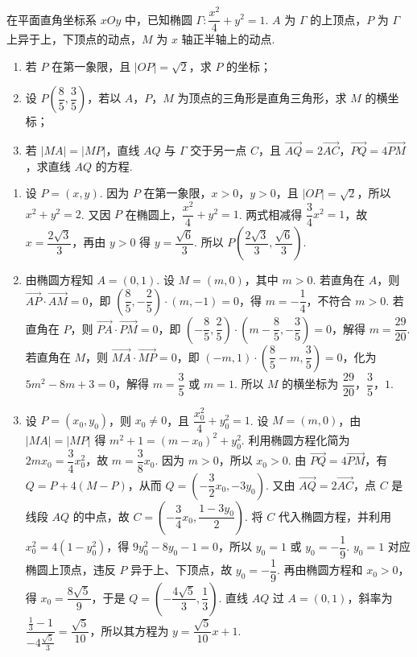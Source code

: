 \begin{problem}
在平面直角坐标系 \(xOy\) 中，已知椭圆 \(\Gamma:\dfrac{x^2}{4}+y^2=1\). \(A\) 为 \(\Gamma\) 的上顶点，\(P\) 为 \(\Gamma\) 上异于上，下顶点的动点，\(M\) 为 \(x\) 轴正半轴上的动点.

\begin{enumerate}
\item 若 \(P\) 在第一象限，且 \(\lvert OP\rvert=\sqrt2\)，求 \(P\) 的坐标；
\item 设 \(P\left(\dfrac85,\dfrac35\right)\)，若以 \(A\)，\(P\)，\(M\) 为顶点的三角形是直角三角形，求 \(M\) 的横坐标；
\item 若 \(\lvert MA\rvert=\lvert MP\rvert\)，直线 \(AQ\) 与 \(\Gamma\) 交于另一点 \(C\)，且 \(\overrightarrow{AQ}=2\overrightarrow{AC}\)，\(\overrightarrow{PQ}=4\overrightarrow{PM}\)，求直线 \(AQ\) 的方程.
\end{enumerate}
\end{problem}

\begin{solution}
\begin{enumerate}
\item 设 \(P=(x,y)\). 因为 \(P\) 在第一象限，\(x>0\)，\(y>0\)，且 \(\lvert OP\rvert=\sqrt2\)，所以 \(x^2+y^2=2\). 又因 \(P\) 在椭圆上，\(\dfrac{x^2}{4}+y^2=1\). 两式相减得 \(\dfrac34x^2=1\)，故 \(x=\dfrac{2\sqrt3}{3}\)，再由 \(y>0\) 得 \(y=\dfrac{\sqrt6}{3}\). 所以 \(P\left(\dfrac{2\sqrt3}{3},\dfrac{\sqrt6}{3}\right)\).
\item 由椭圆方程知 \(A=(0,1)\). 设 \(M=(m,0)\)，其中 \(m>0\). 若直角在 \(A\)，则 \(\overrightarrow{AP}\cdot\overrightarrow{AM}=0\)，即 \(\left(\dfrac85,-\dfrac25\right)\cdot(m,-1)=0\)，得 \(m=-\dfrac14\)，不符合 \(m>0\). 若直角在 \(P\)，则 \(\overrightarrow{PA}\cdot\overrightarrow{PM}=0\)，即 \(\left(-\dfrac85,\dfrac25\right)\cdot\left(m-\dfrac85,-\dfrac35\right)=0\)，解得 \(m=\dfrac{29}{20}\). 若直角在 \(M\)，则 \(\overrightarrow{MA}\cdot\overrightarrow{MP}=0\)，即 \((-m,1)\cdot\left(\dfrac85-m,\dfrac35\right)=0\)，化为 \(5m^2-8m+3=0\)，解得 \(m=\dfrac35\) 或 \(m=1\). 所以 \(M\) 的横坐标为 \(\dfrac{29}{20}\)，\(\dfrac35\)，\(1\).
\item 设 \(P=(x_0,y_0)\)，则 \(x_0\ne0\)，且 \(\dfrac{x_0^2}{4}+y_0^2=1\). 设 \(M=(m,0)\)，由 \(\lvert MA\rvert=\lvert MP\rvert\) 得
\(m^2+1=(m-x_0)^2+y_0^2\). 利用椭圆方程化简为 \(2mx_0=\dfrac34x_0^2\)，故 \(m=\dfrac38x_0\). 因为 \(m>0\)，所以 \(x_0>0\). 由 \(\overrightarrow{PQ}=4\overrightarrow{PM}\)，有 \(Q=P+4(M-P)\)，从而 \(Q=\left(-\dfrac32x_0,-3y_0\right)\). 又由 \(\overrightarrow{AQ}=2\overrightarrow{AC}\)，点 \(C\) 是线段 \(AQ\) 的中点，故 \(C=\left(-\dfrac34x_0,\dfrac{1-3y_0}{2}\right)\). 将 \(C\) 代入椭圆方程，并利用 \(x_0^2=4(1-y_0^2)\)，得 \(9y_0^2-8y_0-1=0\)，所以 \(y_0=1\) 或 \(y_0=-\dfrac19\). \(y_0=1\) 对应椭圆上顶点，违反 \(P\) 异于上、下顶点，故 \(y_0=-\dfrac19\). 再由椭圆方程和 \(x_0>0\)，得 \(x_0=\dfrac{8\sqrt5}{9}\)，于是 \(Q=\left(-\dfrac{4\sqrt5}{3},\dfrac13\right)\). 直线 \(AQ\) 过 \(A=(0,1)\)，斜率为 \(\dfrac{\frac{1}{3}-1}{-4\frac{\sqrt5}{3}}=\dfrac{\sqrt5}{10}\)，所以其方程为 \(y=\dfrac{\sqrt5}{10}x+1\).
\end{enumerate}
\end{solution}

